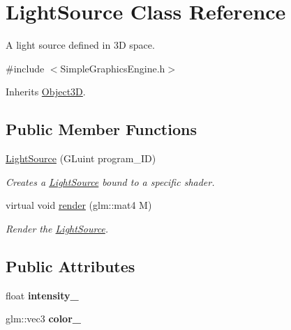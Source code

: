 \hypertarget{class_light_source}{\section{Light\-Source Class Reference}
\label{class_light_source}
}


A light source defined in 3\-D space.  




{\ttfamily \#include $<$Simple\-Graphics\-Engine.\-h$>$}



Inherits \hyperlink{class_object3_d}{Object3\-D}.

\subsection*{Public Member Functions}
\begin{DoxyCompactItemize}
\item 
\hyperlink{class_light_source_a720778d22df1d0ef3315f4ebf6136fba}{Light\-Source} (G\-Luint program\-\_\-\-I\-D)
\begin{DoxyCompactList}\small\item\em Creates a \hyperlink{class_light_source}{Light\-Source} bound to a specific shader. \end{DoxyCompactList}\item 
virtual void \hyperlink{class_light_source_a32245b583ceb37d47b9c169ddfb77e86}{render} (glm\-::mat4 M)
\begin{DoxyCompactList}\small\item\em Render the \hyperlink{class_light_source}{Light\-Source}. \end{DoxyCompactList}\end{DoxyCompactItemize}
\subsection*{Public Attributes}
\begin{DoxyCompactItemize}
\item 
\hypertarget{class_light_source_a1a62623c420ee653e737e585e71da1aa}{float {\bfseries intensity\-\_\-}}\label{class_light_source_a1a62623c420ee653e737e585e71da1aa}

\item 
\hypertarget{class_light_source_aaaaa54449c7054fd4bb45be7d4067851}{glm\-::vec3 {\bfseries color\-\_\-}}\label{class_light_source_aaaaa54449c7054fd4bb45be7d4067851}

\end{DoxyCompactItemize}


